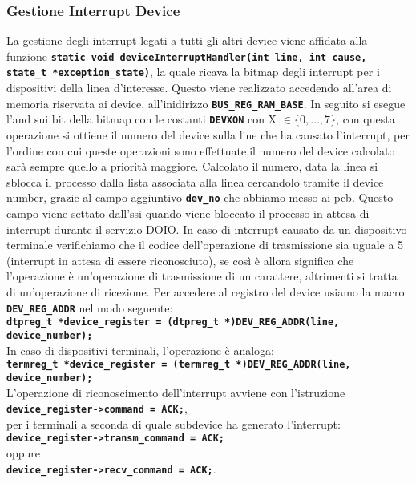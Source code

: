 \documentclass{article}
\begin{document}
\subsubsection{Gestione Interrupt Device}
La gestione degli interrupt legati a tutti gli altri device viene affidata alla funzione \texttt{\textbf{static void deviceInterruptHandler(int line, int cause, state\_t *exception\_state)}}, 
la quale ricava la bitmap degli interrupt per i dispositivi della linea d'interesse. Questo viene realizzato accedendo 
all'area di memoria riservata ai device, all'inidirizzo \texttt{\textbf{BUS\_REG\_RAM\_BASE}}.
In seguito si esegue l'and sui bit della bitmap con le costanti \texttt{\textbf{DEVXON}} con X $\in \{0, \ldots, 7\}$, 
con questa operazione si ottiene il numero del device sulla line che ha causato l'interrupt, per l'ordine con cui queste 
operazioni sono effettuate,il numero del device calcolato sarà sempre quello a priorità maggiore. 
Calcolato il numero, data la linea si sblocca il processo dalla lista associata alla linea cercandolo tramite il device 
number, grazie al campo aggiuntivo \texttt{\textbf{dev\_no}} che abbiamo messo ai pcb. Questo campo viene settato dall'ssi 
quando viene bloccato il processo in attesa di interrupt durante il servizio DOIO. In caso di interrupt causato da un 
dispositivo terminale verifichiamo che il codice dell'operazione di trasmissione sia uguale a 5 (interrupt in attesa di 
essere riconosciuto), se così è allora significa che l'operazione è un'operazione di trasmissione di un carattere, altrimenti 
si tratta di un'operazione di ricezione.
Per accedere al registro del device usiamo la macro \texttt{\textbf{DEV\_REG\_ADDR}} nel modo seguente: \\
\texttt{\textbf{dtpreg\_t *device\_register = (dtpreg\_t *)DEV\_REG\_ADDR(line, device\_number);}} \\
In caso di dispositivi terminali, l'operazione è analoga: \\
\texttt{\textbf{termreg\_t *device\_register = (termreg\_t *)DEV\_REG\_ADDR(line, device\_number);}} \\
L'operazione di riconoscimento dell'interrupt avviene con l'istruzione\\ \texttt{\textbf{device\_register->command = ACK;}}, 
\\per i terminali a seconda di quale subdevice ha generato l'interrupt: \\ \texttt{\textbf{device\_register->transm\_command = ACK;}} \\ oppure \\ \texttt{\textbf{device\_register->recv\_command = ACK;}}.
\end{document}
